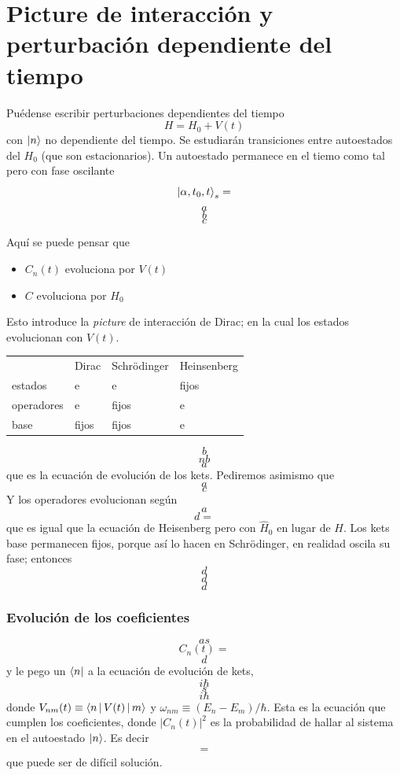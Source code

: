 \documentclass[10pt,oneside]{CBFT_book}
\begin{document}
\chapter{Picture de interacción y perturbación dependiente del tiempo}

Puédense escribir perturbaciones dependientes del tiempo 
\[
	H = H_0 + V(t)
\]
con $\Ket{n}$ no dependiente del tiempo. Se estudiarán transiciones entre autoestados del $H_0$ (que son 
estacionarios). Un autoestado permanece en el tiemo como tal pero con fase oscilante
\[
	\Ket{\alpha,t_0,t}_s = 
\]
\[
	a
\]
\[
	b
\]
\[
	c
\]

Aquí se puede pensar que 
\begin{itemize}
 \item $C_n(t)$ evoluciona por $V(t)$
 \item $C$ evoluciona por $H_0$
\end{itemize}

Esto introduce la {\it picture} de interacción de Dirac; en la cual los estados evolucionan con $V(t)$.

\begin{center}
\begin{tabular}{llll}
 & Dirac & Schrödinger & Heinsenberg \\
estados & e & e & fijos \\
operadores & e & fijos & e\\
base & fijos & fijos & e
\end{tabular}
\end{center}

\[
	b
\]
\[
	nb
\]
\[
	a
\]
que es la ecuación de evolución de los kets.
Pediremos asimismo que 
\[
	a
\]
\[
	c
\]
Y los operadores evolucionan según 
\[
	a
\]
\[
	d =
\]
que es igual que la ecuación de Heisenberg pero con $\hat{H}_0$ en lugar de $H$.
Los kets base permanecen fijos, porque así lo hacen en Schrödinger, en realidad oscila su fase; entonces 
\[
	d
\]
\[
	d
\]
\[
	d
\]

\subsection{Evolución de los coeficientes}

\[
	as
\]
\[
	C_n(t) =
\]
\[
	d
\]
y le pego un $\Bra{n}$ a la ecuación de evolución de kets,
\[
	i\hbar
\]
\[
	s
\]
\[
	i\hbar
\]
donde $V_{nm}(t) \equiv \Braket{n|V(t)|m}$ y $\omega_{nm} \equiv (E_n-E_m)/\hbar$.
Esta es la ecuación que cumplen los coeficientes, donde $|C_n(t)|^2$ es la probabilidad de hallar al sistema 
en el autoestado $\Ket{n}$.
Es decir
\[
	\begin{matrix}
	 =
	\end{matrix}
\]
que puede ser de difícil solución.
\end{document}

